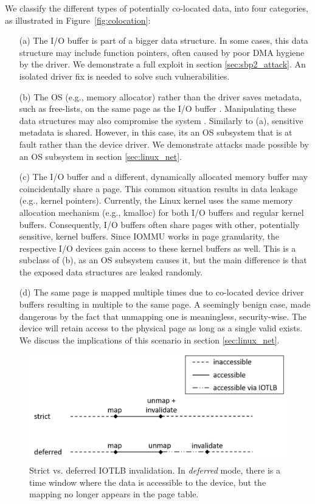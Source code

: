 We classify the different types of potentially co-located data, into four categories, as illustrated in Figure~\ref{fig:colocation}:

\begin{enumerate}
    \item[(a)] The I/O buffer is part of a bigger data structure. In some cases, this data structure may include function pointers, often caused by poor DMA hygiene by the driver. We demonstrate a full exploit in section \ref{sec:sbp2_attack}. An isolated driver fix is needed to solve such vulnerabilities.
    \item[(b)] The OS (e.g., memory allocator) rather than the driver saves metadata, such as free-lists, on the same page as the I/O buffer \cite{Cor07}. Manipulating these data structures may also compromise the system \cite{ak09}. Similarly to (a), sensitive metadata is shared. However, in this case, its an OS subsystem that is at fault rather than the device driver. We demonstrate attacks made possible by an OS subsystem in section \ref{sec:linux_net}.
    \item[(c)] The I/O buffer and a different, dynamically allocated memory buffer may coincidentally share a page. This common situation results in data leakage (e.g., kernel pointers).
    Currently, the Linux kernel uses the same memory allocation mechanism (e.g., kmalloc) for both I/O buffers and regular kernel buffers. Consequently, I/O buffers often share pages with other, potentially sensitive, kernel buffers. Since IOMMU works in page granularity, the respective I/O devices gain access to these kernel buffers as well. This is a subclass of (b), as an OS subsystem causes it, but the main difference is that the exposed data structures are leaked randomly.
     \item[(d)] The same page is mapped multiple times due to co-located device driver buffers resulting in multiple \iova{} to the same page. A seemingly benign case, made dangerous by the fact that unmapping one \iova{} is meaningless, security-wise. The device will retain access to the physical page as long as a single valid \iova{} exists. We discuss the implications of this scenario in section \ref{sec:linux_net}.
\end{enumerate}

\begin{figure}[t]
    \centering
    \includegraphics[width=1.3\columnwidth]{figs/deferred.png}
    \caption{Strict vs. deferred IOTLB invalidation. In \emph{deferred} mode, there is a time window where the data is accessible to the device, but the mapping no longer appears in the page table.}
    \label{fig:deferred}
\end{figure}
